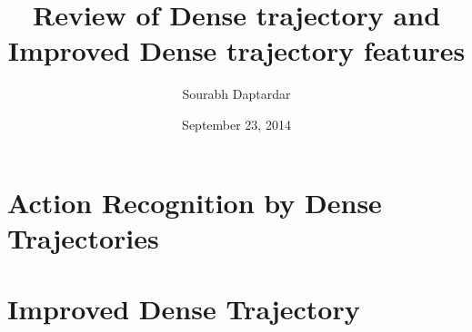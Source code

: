 \documentclass[12pt]{amsart}
\title{Review of Dense trajectory and Improved Dense trajectory features}
\author{Sourabh Daptardar}
\date{September 23, 2014} %
\begin{document}
\maketitle
\tableofcontents

\section{Action Recognition by Dense Trajectories}
\section{Improved Dense Trajectory}
\end{document}
